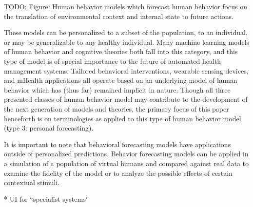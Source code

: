 TODO: Figure: Human behavior models which forecast human behavior focus on the translation of environmental context and internal state to future actions.

These models can be personalized to a subset of the population, to an individual, or may be generalizable to any healthy individual. 
Many machine learning models of human behavior and cognitive theories both fall into this category, and this type of model is of special importance to the future of automated health management systems. 
Tailored behavioral interventions, wearable sensing devices, and mHealth applications all operate based on an underlying model of human behavior which has (thus far) remained implicit in nature. 
Though all three presented classes of human behavior model may contribute to the development of the next generation of models and theories, the primary focus of this paper henceforth is on terminologies as applied to this type of human behavior model (type 3: personal forecasting).

It is important to note that behavioral forecasting models have applications outside of personalized predictions. 
Behavior forecasting models can be applied in a simulation of a population of virtual humans and compared against real data to examine the fidelity of the model or to analyze the possible effects of certain contextual stimuli. 


* UI for “specialist systems”
